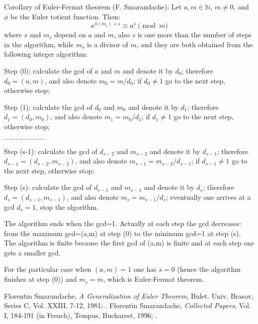 \documentclass[12pt]{article}
\begin{document}
Corollary of Euler-Fermat theorem (F. Smarandache):
\newline Let $a, m \in \mathbb{N}$, $m \neq 0$, and $\phi$ be the Euler totient function. Then:
$$a^{\phi(m_s)+s} \equiv a^s \pmod{m}$$
where $s$ and $m_s$ depend on $a$ and $m$, also $s$ is one more than the number of steps in the algorithm, while $m_s$ is a divisor of $m$, and they are both obtained from the following integer algorithm:

Step (0):
\newline calculate the gcd of $a$ and $m$ and denote it by $d_0$;
\newline therefore $d_0=(a,m)$, and also denote $m_0=m/d_0$;
\newline if $d_0 \neq 1$ go to the next step, otherwise stop;

Step (1):
\newline calculate the gcd of $d_0$ and $m_0$ and denote it by $d_1$;
\newline therefore $d_1=(d_0,m_0)$, and also denote $m_1=m_0/d_1$;
\newline if $d_1 \neq 1$ go to the next step, otherwise stop;

$ \ldots \ldots \ldots \ldots \ldots \ldots \ldots $

Step (s-1):
\newline calculate the gcd of $d_{s-2}$ and $m_{s-2}$ and denote it by $d_{s-1}$;
\newline therefore $d_{s-1}=(d_{s-2},m_{s-2})$, and also denote $m_{s-1}=m_{s-2}/d_{s-1}$;
\newline if $d_{s-1} \neq 1$ go to the next step, otherwise stop;

Step (s):
\newline calculate the gcd of $d_{s-1}$ and $m_{s-1}$ and denote it by $d_{s}$;
\newline therefore $d_{s}=(d_{s-1},m_{s-1})$, and also denote $m_{s}=m_{s-1}/d_{s}$;
\newline eventually one arrives at a gcd $d_{s} = 1$, stop the algorithm.

The algorithm ends when the gcd=1.  Actually at each step the gcd decreases: from the maximum gcd=(a,m) at step (0) to the minimum gcd=1 at step (s).  The algorithm is finite because the first gcd of (a,m) is finite and at each step one gets a smaller gcd.

For the particular case when $(a,m)=1$ one has $s=0$ (hence the algorithm finishes at step (0)) and $m_s=m$, which is Euler-Fermat theorem.

\begin{thebibliography}{9}
 Florentin Smarandache, {\em A Generalization of Euler Theorem}, Bulet. Univ. Brasov, Series C, Vol. XXIII, 7-12, 1981;
.
 Florentin Smarandache, {\em Collected Papers}, Vol. I, 184-191 (in French), Tempus, Bucharest, 1996; 
.
\end{thebibliography}

\end{document}
